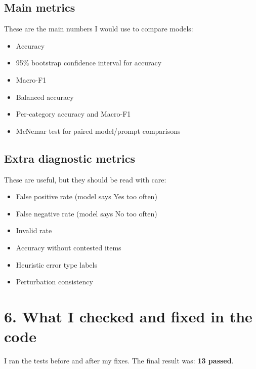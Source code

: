 \documentclass[11pt, a4paper]{article}
\begin{document}
\subsection*{\color{bambergnavy} Main metrics}
These are the main numbers I would use to compare models:
\begin{itemize}[leftmargin=*]
    \item Accuracy
    \item 95\% bootstrap confidence interval for accuracy
    \item Macro-F1
    \item Balanced accuracy
    \item Per-category accuracy and Macro-F1
    \item McNemar test for paired model/prompt comparisons
\end{itemize}

\subsection*{\color{bambergnavy} Extra diagnostic metrics}
These are useful, but they should be read with care:
\begin{itemize}[leftmargin=*]
    \item False positive rate (model says Yes too often)
    \item False negative rate (model says No too often)
    \item Invalid rate
    \item Accuracy without contested items
    \item Heuristic error type labels
    \item Perturbation consistency
\end{itemize}

\FloatBarrier
{}
\section*{\color{bambergnavy} 6. What I checked and fixed in the code}
I ran the tests before and after my fixes. The final result was: \textbf{13 passed}.
\end{document}
